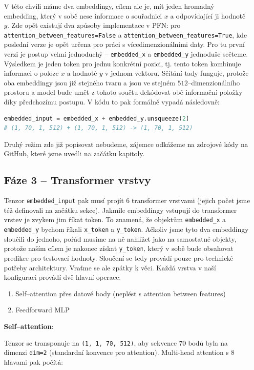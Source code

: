 V této chvíli máme dva embeddingy, cílem ale je, mít jeden hromadný embedding, který v sobě nese informace o souřadnici $x$ a odpovídající ji hodnotě $y$.
Zde opět existují dva způsoby implementace v PFN: pro \lstinline|attention_between_features=False| a \lstinline|attention_between_features=True|, kde poslední verze je opět určena pro práci s vícedimenzionálními daty. 
Pro tu první verzi je postup velmi jednoduchý – \texttt{embedded\_x} a \texttt{embedded\_y} jednoduše sečteme. 
Výsledkem je jeden token pro jednu konkrétní pozici, tj. tento token kombinuje informaci o poloze $x$ a hodnotě $y$ v jednom vektoru.
Sčítání tady funguje, protože oba embeddingy jsou již stejného tvaru a jsou ve stejném $512$–dimenzionálního prostoru a model bude umět z tohoto součtu dekódovat obě informační položky díky předchozímu postupu.
V kódu to pak formálně vypadá následovně:
\begin{lstlisting}[language=Python]
embedded_input = embedded_x + embedded_y.unsqueeze(2)  
# (1, 70, 1, 512) + (1, 70, 1, 512) -> (1, 70, 1, 512)
\end{lstlisting}
Druhý režim zde již popisovat nebudeme, zájemce odkážeme na zdrojové kódy na GitHub, které jsme uvedli na začátku kapitoly.

\subsection{Fáze 3 – Transformer vrstvy}
Tenzor \texttt{embedded\_input} pak musí projít $6$ transformer vrstvami (jejich počet jsme též definovali na začátku sekce).
Jakmile embeddingy vstupují do transformer vrstev je zvykem jim říkat token. 
To znamená, že objektům \texttt{embedded\_x} a \texttt{embedded\_y} bychom říkali \texttt{x\_token} a \texttt{y\_token}.
Ačkoliv jsme tyto dva embeddingy sloučili do jednoho, pořád musíme na ně nahlížet jako na samostatné objekty, protože naším cílem je nakonec získat \texttt{y\_token}, který v sobě bude obsahovat predikce pro testovací hodnoty.
Sloučení se tedy provádí pouze pro technické potřeby architektury.
Vraťme se ale zpátky k věci.
Každá vrstva v naší konfiguraci provádí dvě hlavní operace:
\begin{enumerate}
    \item Self–attention přes datové body (neplést s attention between features)
    \item Feedforward MLP
\end{enumerate}

\textbf{Self–attention}:

Tenzor se transponuje na \lstinline|(1, 1, 70, 512)|, aby sekvence $70$ bodů byla na dimenzi \lstinline|dim=2| (standardní konvence pro attention).
Multi-head attention s $8$ hlavami pak počítá:

